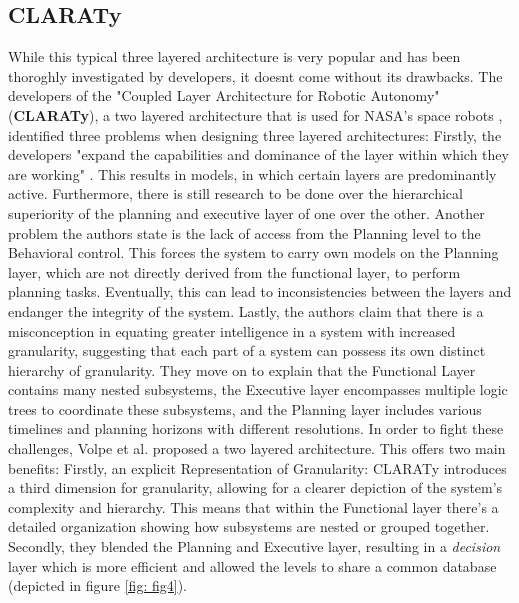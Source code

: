 \documentclass[%
paper=A4,               %
twoside=true,           %
openright,              %
11pt,                   %
bibliography=totoc,     %
titlepage=on,           %
DIV=12,                 %
BCOR=1.5cm,             %
parskip=half,            %
final
]{scrreprt}
\begin{document}
	\subsection{CLARATy}
	While this typical three layered architecture is very popular and has been thoroghly investigated by developers, it doesnt come without its drawbacks. The developers of the "Coupled Layer Architecture for Robotic Autonomy" (\textbf{CLARATy}), a two layered architecture that is used for NASA's space robots \autocite{sicilianoSpringerHandbookRobotics2016}, identified three problems when designing three layered architectures:
	Firstly, the developers "expand the capabilities and dominance of the layer within which they are working" \autocite{volpeCLARAtyArchitectureRobotic2001}. This results in models, in which certain layers are predominantly active. Furthermore, there is still research to be done over the hierarchical superiority of the planning and executive layer of one over the other. \autocite{volpeCLARAtyArchitectureRobotic2001} Another problem the authors state is the lack of access from the Planning level to the Behavioral control. This forces the system to carry own models on the Planning layer, which are not directly derived from the functional layer, to perform planning tasks. Eventually, this can lead to inconsistencies between the layers and endanger the integrity of the system. \autocite{volpeCLARAtyArchitectureRobotic2001} Lastly, the authors claim that there is a misconception in equating greater intelligence in a system with increased granularity, suggesting that each part of a system can possess its own distinct hierarchy of granularity. They move on to explain that the Functional Layer contains many nested subsystems, the Executive layer encompasses multiple logic trees to coordinate these subsystems, and the Planning layer includes various timelines and planning horizons with different resolutions. \autocite{volpeCLARAtyArchitectureRobotic2001}
	In order to fight these challenges, Volpe et al. proposed a two layered architecture. This offers two main benefits: \newline
	Firstly, an explicit Representation of Granularity: CLARATy introduces a third dimension for granularity, allowing for a clearer depiction of the system's complexity and hierarchy. This means that within the Functional layer there's a detailed organization showing how subsystems are nested or grouped together. Secondly, they blended the Planning and Executive layer, resulting in a \textit{decision} layer which is more efficient and allowed the levels to share a common database (depicted in figure \ref{fig: fig4}). \autocite{volpeCLARAtyArchitectureRobotic2001} 
	
\end{document}
